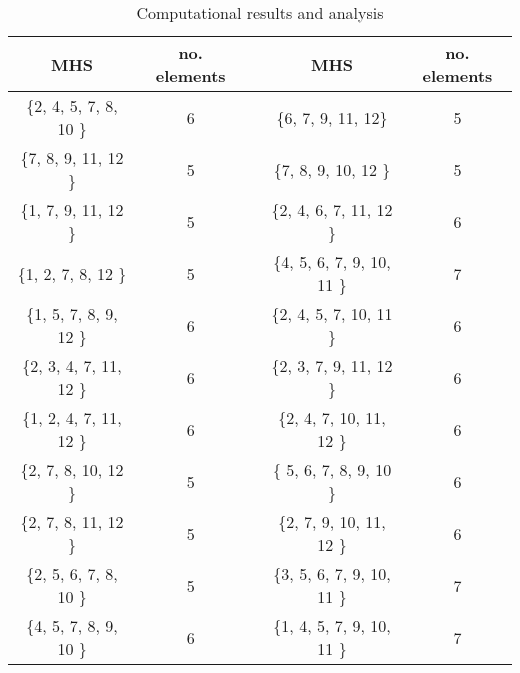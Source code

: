 \begin{table}
	\begin{center}
		\caption{Computational results and analysis}
		\label{tab:tab5}
		\begin{tabular}{cc|c|cc}
			\hline
			MHS & no. elements & & MHS & no. elements \\
			\hline
			\{2, 4, 5, 7, 8, 10 \}  & 6  && \{6, 7, 9, 11, 12\}          & 5 \\
			\{7, 8, 9, 11, 12 \}    & 5  && \{7, 8, 9, 10, 12 \}         & 5 \\
			\{1, 7, 9, 11, 12 \}    & 5  && \{2, 4, 6, 7, 11, 12  \}     & 6 \\
			\{1, 2, 7, 8, 12 \}     & 5  && \{4, 5, 6, 7, 9, 10, 11  \}  & 7  \\
			\{1, 5, 7, 8, 9, 12 \}  & 6  && \{2, 4, 5, 7, 10, 11  \}     & 6  \\
			\{2, 3, 4, 7, 11, 12 \} & 6  && \{2, 3, 7, 9, 11, 12  \}     & 6  \\
			\{1, 2, 4, 7, 11, 12 \} & 6  && \{2, 4, 7, 10, 11, 12  \}    & 6 \\
			\{2, 7, 8, 10, 12 \}    & 5  && \{ 5, 6, 7, 8, 9, 10 \}      & 6 \\
			\{2, 7, 8, 11, 12 \}    & 5  && \{2, 7, 9, 10, 11, 12  \}    & 6 \\
			\{2, 5, 6, 7, 8, 10 \}  & 5  && \{3, 5, 6, 7, 9, 10, 11  \}  & 7 \\
			\{4, 5, 7, 8, 9, 10 \}  & 6  && \{1, 4, 5, 7, 9, 10, 11  \}  & 7 \\
			\hline
		\end{tabular}
	\end{center}
\end{table}




